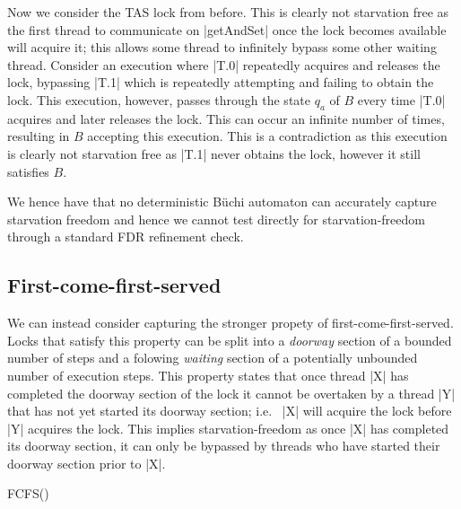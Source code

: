 
Now we consider the TAS lock from before. This is clearly not starvation free as the first thread to communicate on |getAndSet| once the lock becomes available will acquire it; this allows some thread to infinitely bypass some other waiting thread. Consider an execution where |T.0| repeatedly acquires and releases the lock, bypassing |T.1| which is repeatedly attempting and failing to obtain the lock. This execution, however, passes through the state $q_{a}$ of $B$ every time |T.0| acquires and later releases the lock. This can occur an infinite number of times, resulting in $B$ accepting this execution. This is a contradiction as this execution is clearly not starvation free as |T.1| never obtains the lock, however it still satisfies $B$.



We hence have that no deterministic B{\"u}chi automaton can accurately capture starvation freedom and hence we cannot test directly for starvation-freedom through a standard FDR refinement check.

\subsection{First-come-first-served}

We can instead consider capturing the stronger propety of first-come-first-served. Locks that satisfy this property can be split into a \emph{doorway} section of a bounded number of steps and a folowing \emph{waiting} section of a potentially unbounded number of execution steps. This property states that once thread |X| has completed the doorway section of the lock it cannot be overtaken by a thread |Y| that has not yet started its doorway section; i.e.~ |X| will acquire the lock before |Y| acquires the lock. This implies starvation-freedom as once |X| has completed its doorway section, it can only be bypassed by threads who have started their doorway section prior to |X|.

\begin{cspm}
  FCFS()
\end{cspm}

